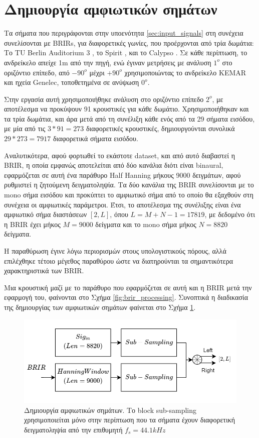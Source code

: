 \section{Δημιουργία αμφιωτικών σημάτων} \label{sec:bin_sig_creation}

\noindent
Τα σήματα που περιγράφονται στην υποενότητα \ref{sec:input_signals} στη συνέχεια συνελίσονται με BRIRs, για διαφορετικές γωνίες, που προέρχονται από τρία δωμάτια: Το TU Berlin Auditorium 3 \cite{Wierstorf2016b}, το Spirit \cite{Wierstorf2016a}, και το Calypso \cite{Wierstorf2016}. Σε κάθε περίπτωση, το ανδρείκελο απείχε 1m από την πηγή, ενώ έγιναν μετρήσεις με ανάλυση $1^o$ στο οριζόντιο επίπεδο, από $-90^o$ μέχρι $+90^o$ χρησιμοποιώντας το ανδρείκελο KEMAR και ηχεία Genelec, τοποθετημένα σε ανύψωση $0^o$. 

Στην εργασία αυτή χρησιμοποιήθηκε ανάλυση στο οριζόντιο επίπεδο $2^o$, με αποτέλεσμα να προκύψουν 91 κρουστικές για κάθε δωμάτιο. Χρησιμοποιήθηκαν και τα τρία δωμάτια, και άρα μετά από τη συνέλιξη κάθε ενός από τα 29 σήματα εισόδου, με μία από τις $3 * 91 = 273$ διαφορετικές κρουστικές, δημιουργούνται συνολικά $29 * 273 = 7917$ διαφορετικά σήματα εισόδου.

Αναλυτικότερα, αφού φορτωθεί το εκάστοτε dataset, και από αυτό διαβαστεί η BRIR, η οποία εμφανώς αποτελείται από δύο κανάλια διότι είναι binaural, εφαρμόζεται σε αυτή ένα παράθυρο Half Hanning μήκους 9000 δειγμάτων, αφού ρυθμιστεί η ζητούμενη δειγματοληψία. Τα δύο κανάλια της BRIR συνελίσονται με το mono σήμα εισόδου και προκύπτει το αμφιωτικό σήμα από το οποίο θα εξαχθούν στη συνέχεια οι αμφιωτικές παράμετροι. Έτσι, το αποτέλεσμα της συνέλιξης είναι ένα αμφιωτικό σήμα διαστάσεων $[2,L]$, όπου $L = M + N - 1 = 17819$, με δεδομένο ότι η BRIR έχει μήκος $M = 9000$ δείγματα και το mono σήμα μήκος $N = 8820$ δείγματα.

Η παραθύρωση έγινε λόγω περιορισμών στους υπολογιστικούς πόρους, αλλά επιλέχθηκε τέτοιο μέγεθος παραθύρου ώστε να διατηρούνται τα σημαντικότερα χαρακτηριστικά των BRIR. 

Μια κρουστική μαζί με το παράθυρο που εφαρμόζεται σε αυτή και η BRIR μετά την εφαρμογή του, φαίνονται στο Σχήμα \ref{fig:brir_processing}. Συνοπτικά η διαδικασία της δημιουργίας των αμφιωτικών σημάτων φαίνεται στο Σχήμα \ref{fig:binaural_signal_gen_block}.

\begin{figure}[h]
  \centering
  \includegraphics[width=\textwidth]{images/binaural_signal_gen_block.png}
  \caption{Δημιουργία αμφιωτικών σημάτων. Το block sub-sampling χρησιμοποιείται μόνο στην περίπτωση που τα σήματα έχουν διαφορετική δειγματοληψία από την επιθυμητή $f_s = 44.1 kHz$}
  \label{fig:binaural_signal_gen_block}
\end{figure}

